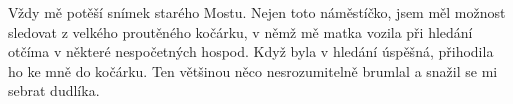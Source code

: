 
Vždy mě potěší snímek starého Mostu. Nejen toto náměstíčko, jsem měl
možnost sledovat z velkého proutěného kočárku, v němž mě matka vozila
při hledání otčíma v některé nespočetných hospod. Když byla v hledání
úspěšná, přihodila ho ke mně do kočárku. Ten většinou něco
nesrozumitelně brumlal a snažil se mi sebrat dudlíka.
